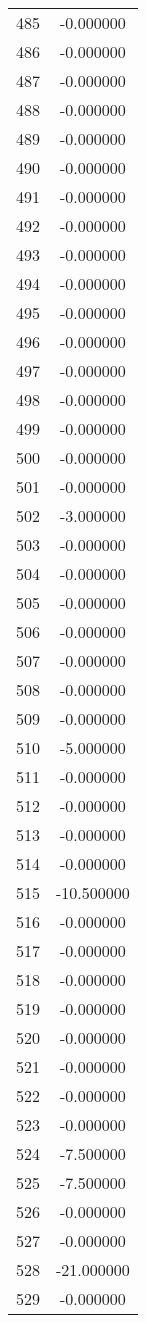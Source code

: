 \documentclass[12pt]{article}
\begin{document}
\begin{longtable}{@{}cc@{}}
485 & -0.000000 \\
486 & -0.000000 \\
487 & -0.000000 \\
488 & -0.000000 \\
489 & -0.000000 \\
490 & -0.000000 \\
491 & -0.000000 \\
492 & -0.000000 \\
493 & -0.000000 \\
494 & -0.000000 \\
495 & -0.000000 \\
496 & -0.000000 \\
497 & -0.000000 \\
498 & -0.000000 \\
499 & -0.000000 \\
500 & -0.000000 \\
501 & -0.000000 \\
502 & -3.000000 \\
503 & -0.000000 \\
504 & -0.000000 \\
505 & -0.000000 \\
506 & -0.000000 \\
507 & -0.000000 \\
508 & -0.000000 \\
509 & -0.000000 \\
510 & -5.000000 \\
511 & -0.000000 \\
512 & -0.000000 \\
513 & -0.000000 \\
514 & -0.000000 \\
515 & -10.500000 \\
516 & -0.000000 \\
517 & -0.000000 \\
518 & -0.000000 \\
519 & -0.000000 \\
520 & -0.000000 \\
521 & -0.000000 \\
522 & -0.000000 \\
523 & -0.000000 \\
524 & -7.500000 \\
525 & -7.500000 \\
526 & -0.000000 \\
527 & -0.000000 \\
528 & -21.000000 \\
529 & -0.000000 \\

\end{longtable}
\end{document}
